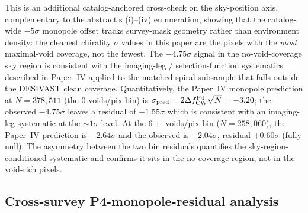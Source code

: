 \documentclass[twocolumn,linenumbers]{aastex702}
\begin{document}
This is an additional catalog-anchored cross-check on the sky-position axis, complementary to the abstract's (i)--(iv) enumeration, showing that the catalog-wide
$-5\sigma$ monopole offset tracks survey-mask geometry rather than environment
density: the cleanest chirality $\sigma$ values in this paper are the
pixels with the \emph{most} maximal-void coverage, not the fewest. The
$-4.75\sigma$ signal in the no-void-coverage sky region is consistent
with the imaging-leg / selection-function systematics described in
Paper~IV applied to the matched-spiral subsample that falls outside
the DESIVAST clean coverage. Quantitatively, the Paper~IV monopole
prediction at $N = 378{,}511$ (the 0-voids/pix bin) is
$\sigma_{\rm pred} = 2\Delta f_{\rm CW}^{\rm P4}\sqrt{N} = -3.20$;
the observed $-4.75\sigma$ leaves a residual of $-1.55\sigma$ which
is consistent with an imaging-leg systematic at the
$\sim\!1\sigma$ level. At the $6+$ voids/pix bin
($N = 258{,}060$), the Paper~IV prediction is $-2.64\sigma$ and the
observed is $-2.04\sigma$, residual $+0.60\sigma$ (fully null).
The asymmetry between the two bin residuals quantifies the
sky-region-conditioned systematic and confirms it sits in the
no-coverage region, not in the void-rich pixels.

\subsection{Cross-survey P4-monopole-residual analysis}\label{sec:desivast_p4_residual}
\end{document}
